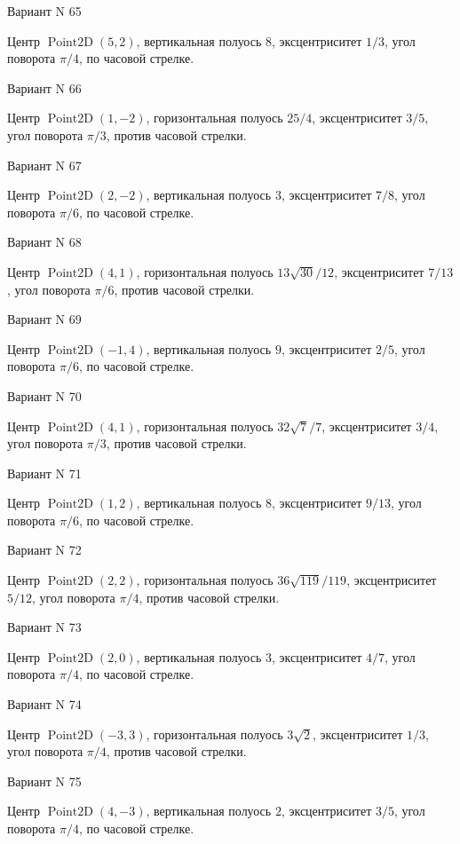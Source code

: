\documentclass[11pt]{report}
\begin{document}
Вариант N 65

Центр $\operatorname{Point2D}\left(5, 2\right)$, вертикальная полуось $8$, эксцентриситет $1 / 3$, угол поворота $\pi / 4$, по часовой стрелке.

Вариант N 66

Центр $\operatorname{Point2D}\left(1, -2\right)$, горизонтальная полуось $25 / 4$, эксцентриситет $3 / 5$, угол поворота $\pi / 3$, против часовой стрелки.

Вариант N 67

Центр $\operatorname{Point2D}\left(2, -2\right)$, вертикальная полуось $3$, эксцентриситет $7 / 8$, угол поворота $\pi / 6$, по часовой стрелке.

Вариант N 68

Центр $\operatorname{Point2D}\left(4, 1\right)$, горизонтальная полуось $13 \sqrt{30} / 12$, эксцентриситет $7 / 13$, угол поворота $\pi / 6$, против часовой стрелки.

Вариант N 69

Центр $\operatorname{Point2D}\left(-1, 4\right)$, вертикальная полуось $9$, эксцентриситет $2 / 5$, угол поворота $\pi / 6$, по часовой стрелке.

Вариант N 70

Центр $\operatorname{Point2D}\left(4, 1\right)$, горизонтальная полуось $32 \sqrt{7} / 7$, эксцентриситет $3 / 4$, угол поворота $\pi / 3$, против часовой стрелки.

Вариант N 71

Центр $\operatorname{Point2D}\left(1, 2\right)$, вертикальная полуось $8$, эксцентриситет $9 / 13$, угол поворота $\pi / 6$, по часовой стрелке.

Вариант N 72

Центр $\operatorname{Point2D}\left(2, 2\right)$, горизонтальная полуось $36 \sqrt{119} / 119$, эксцентриситет $5 / 12$, угол поворота $\pi / 4$, против часовой стрелки.

Вариант N 73

Центр $\operatorname{Point2D}\left(2, 0\right)$, вертикальная полуось $3$, эксцентриситет $4 / 7$, угол поворота $\pi / 4$, по часовой стрелке.

Вариант N 74

Центр $\operatorname{Point2D}\left(-3, 3\right)$, горизонтальная полуось $3 \sqrt{2}$, эксцентриситет $1 / 3$, угол поворота $\pi / 4$, против часовой стрелки.

Вариант N 75

Центр $\operatorname{Point2D}\left(4, -3\right)$, вертикальная полуось $2$, эксцентриситет $3 / 5$, угол поворота $\pi / 4$, по часовой стрелке.
\end{document}
